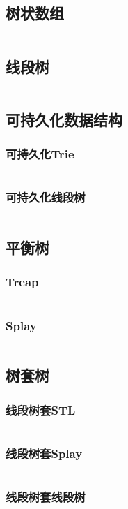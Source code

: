 \documentclass[a4paper,12pt]{article}
\begin{document}
\subsection{树状数组}
\inputminted[breaklines, linenos]{c++}{ds/tree_array.cc}
\subsection{线段树}
\inputminted[breaklines, linenos]{c++}{ds/seg_tree.cc}
\subsection{可持久化数据结构}
\subsubsection{可持久化Trie}
\inputminted[breaklines, linenos]{c++}{ds/last_trie.cc}
\subsubsection{可持久化线段树}
\inputminted[breaklines, linenos]{c++}{ds/last_seg.cc}
\subsection{平衡树}
\subsubsection{Treap}
\inputminted[breaklines, linenos]{c++}{ds/treap.cc}
\subsubsection{Splay}
\inputminted[breaklines, linenos]{c++}{ds/splay.cc}
\subsection{树套树}
\subsubsection{线段树套STL}
\inputminted[breaklines, linenos]{c++}{ds/stl_in_seg.cc}
\subsubsection{线段树套Splay}
\inputminted[breaklines, linenos]{c++}{ds/splay_in_seg.cc}
\subsubsection{线段树套线段树}
\inputminted[breaklines, linenos]{c++}{ds/seg_in_seg.cc}
\end{document}
